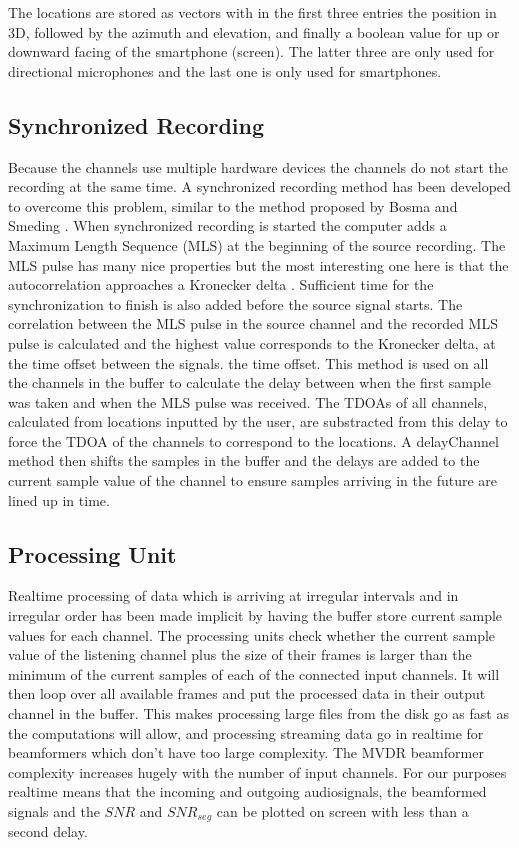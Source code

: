 The locations are stored as vectors with in the first three entries the position in 3D, followed by the azimuth and elevation, and finally a boolean value for up or downward facing of the smartphone (screen). The latter three are only used for directional microphones and the last one is only used for smartphones. 

\subsection{Synchronized Recording}
\label{sec:des_sync}
Because the channels use multiple hardware devices the channels do not start the recording at the same time. A synchronized recording method has been developed to overcome this problem, similar to the method proposed by Bosma and Smeding \cite{BAP:RoySjoerd}.
When synchronized recording is started the computer adds a Maximum Length Sequence (MLS) at the beginning of the source recording. The MLS pulse has many nice properties but the most interesting one here is that the autocorrelation approaches a Kronecker delta \cite{hee2003impulse}. Sufficient time for the synchronization to finish is also added before the source signal starts. The correlation between the MLS pulse in the source channel and the recorded MLS pulse is calculated and the highest value corresponds to the Kronecker delta, at the time offset between the signals.
the time offset. This method is used on all the channels in the buffer to calculate the delay between when the first sample was taken and when the MLS pulse was received. \newline
The TDOAs of all channels, calculated from locations inputted by the user, are substracted from this delay to force the TDOA of the channels to correspond to the locations. \newline
A delayChannel method then shifts the samples in the buffer and the delays are added to the current sample value of the channel to ensure samples arriving in the future are lined up in time.

\subsection{Processing Unit}
\label{sec:des_processing}
Realtime processing of data which is arriving at irregular intervals and in irregular order has been made implicit by having the buffer store current sample values for each channel. The processing units check whether the current sample value of the listening channel plus the size of their frames is larger than the minimum of the current samples of each of the connected input channels. It will then loop over all available frames and put the processed data in their output channel in the buffer. This makes processing large files from the disk go as fast as the computations will allow, and processing streaming data go in realtime for beamformers which don't have too large complexity. The MVDR beamformer complexity increases hugely with the number of input channels. For our purposes realtime means that the incoming and outgoing audiosignals, the beamformed signals and the $SNR$ and $SNR_{seg}$ can be plotted on screen with less than a second delay.

